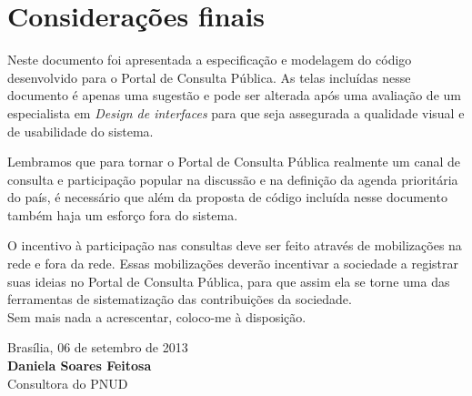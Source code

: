 \documentclass[11pt]{article}
\begin{document}
\newpage

\section{Considerações finais}

Neste documento foi apresentada a especificação e modelagem do código
desenvolvido para o Portal de Consulta Pública. As telas incluídas nesse
documento é apenas uma sugestão e pode ser alterada após uma avaliação
de um especialista em {\it Design de interfaces} para que seja
assegurada a qualidade visual e de usabilidade do sistema.

Lembramos que para tornar o Portal de Consulta Pública realmente um canal de
consulta e participação popular na discussão e na definição da agenda
prioritária do país, é necessário que além da proposta de código
incluída nesse documento também haja um esforço fora do sistema.

O incentivo à participação nas consultas deve ser feito através de
mobilizações na rede e fora da rede. Essas mobilizações deverão
incentivar a sociedade a registrar suas ideias no Portal de Consulta
Pública, para que assim ela se torne uma das ferramentas de
sistematização das contribuições da sociedade.\\[1cm]

Sem mais nada a acrescentar, coloco-me à disposição.\\[1cm]

\begin{minipage}{\textwidth}
  Brasília, 06 de setembro de 2013\\[1cm]
  \textbf{Daniela Soares Feitosa}\\
  \small Consultora do PNUD
\end{minipage}

\newpage
\appendix
\appendixpage

\end{document}
